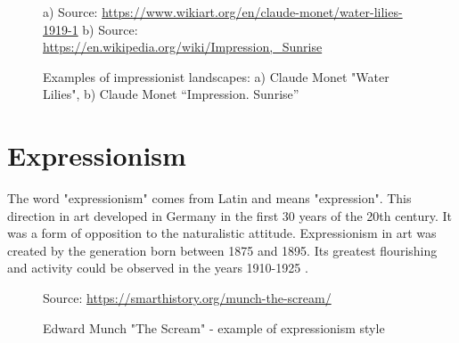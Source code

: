 \documentclass{report}
\begin{document}
\begin{figure}[h]
\center
a)  {Source: \url{https://www.wikiart.org/en/claude-monet/water-lilies-1919-1}}
b)  {Source: \url{https://en.wikipedia.org/wiki/Impression,_Sunrise}}
\caption{Examples of impressionist landscapes: a) Claude Monet "Water Lilies",
b) Claude Monet “Impression. Sunrise”}
\label{fig:monet}
\end{figure}

\section{Expressionism}

The word "expressionism" comes from Latin and means "expression". This direction in art developed in Germany in the first 30 years of the 20th century. It was a form of opposition to the naturalistic attitude. Expressionism in art was created by the generation born between 1875 and 1895. Its greatest flourishing and activity could be observed in the years 1910-1925 \cite{BOOK:2}.

\begin{figure}[h]
\center
{} {Source: \url{https://smarthistory.org/munch-the-scream/}}
\caption{Edward Munch "The Scream" - example of expressionism style}
\label{fig:scream}
\end{figure}
\end{document}
